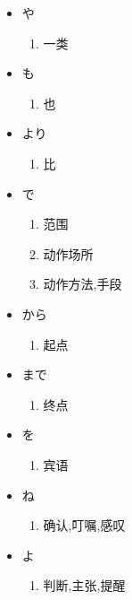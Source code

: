 \begin{itemize}
\begin{enumerate}
            \end{enumerate}
        \item や
            \begin{enumerate}
                \item 一类
            \end{enumerate}
        \item も
            \begin{enumerate}
                \item 也
            \end{enumerate}
        \item より
            \begin{enumerate}
                \item 比
            \end{enumerate}
        \item で
            \begin{enumerate}
                \item 范围
                \item 动作场所
                \item 动作方法,手段
            \end{enumerate}
        \item から
            \begin{enumerate}
                \item 起点
            \end{enumerate}
        \item まで
            \begin{enumerate}
                \item 终点
            \end{enumerate}
        \item を
            \begin{enumerate}
                \item 宾语
            \end{enumerate}
        \item ね
            \begin{enumerate}
                \item 确认,叮嘱,感叹
            \end{enumerate}
        \item よ
            \begin{enumerate}
                \item 判断,主张,提醒

\end{enumerate}
\end{itemize}
